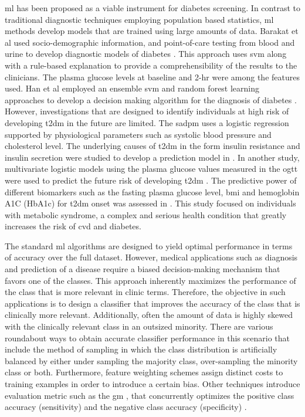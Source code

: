 \documentclass[journal,comsoc]{IEEEtran}
\renewcommand{\^}{\hat}  %
\begin{document}
\ac{ml} has been proposed as a viable instrument for diabetes screening. In contrast to traditional diagnostic techniques employing population based statistics, \ac{ml} methods develop models that are trained using large amounts of data. Barakat et al used socio-demographic information, and point-of-care testing from blood and urine to develop diagnostic models of diabetes \cite{barakat_intelligible_2010}. This approach uses \ac{svm} along with a rule-based explanation to provide a comprehensibility of the results to the clinicians. The plasma glucose levels at baseline and 2-hr were among the features used. Han et al employed an ensemble \ac{svm} and random forest learning approaches to develop a decision making algorithm for the diagnosis of diabetes \cite{han_rule_2015}. However, investigations that are designed to identify individuals at high risk of developing \ac{t2dm} in the future are limited. The \ac{sadpm} \cite{stern2002identification} uses a logistic regression supported by physiological parameters such as systolic blood pressure and cholesterol level. The underlying causes of \ac{t2dm} in the form insulin resistance and insulin secretion were studied to develop a prediction model in \cite{abdul-ghani_what_2007}. In another study, multivariate logistic models using the plasma glucose values measured in the \ac{ogtt} were used to predict the future risk of developing \ac{t2dm} \cite{abdul-ghani_two-step_2011,abdul2009fasting}. The predictive power of different biomarkers such as the fasting plasma glucose level, \ac{bmi} and hemoglobin A1C (HbA1c) for \ac{t2dm} onset was assessed in \cite{Ozery-Flato2013}. This study focused on individuals with metabolic syndrome, a complex and serious health condition that greatly increases the risk of \ac{cvd} and diabetes.

The standard \ac{ml} algorithms are designed to yield optimal performance in terms of accuracy over the full dataset. However, medical applications such as diagnosis and prediction of a disease require a biased decision-making mechanism that favors one of the classes. This approach inherently maximizes the performance of the class that is more relevant in clinic terms. Therefore, the objective in such applications is to design a classifier that improves the accuracy of the class that is clinically more relevant. Additionally, often the amount of data is highly skewed with the clinically relevant class in an outsized minority. There are various roundabout ways to obtain accurate classifier performance in this scenario that include the method of sampling \cite{chawla2002smote} in which the class distribution is artificially balanced by either under sampling the majority class, over-sampling the minority class or both. Furthermore, feature weighting schemes assign distinct costs to training examples \cite{Domingos} in order to introduce a certain bias. Other techniques introduce evaluation metric such as the \ac{gm} \cite{kubat1997addressing}, that concurrently optimizes the positive class accuracy (sensitivity) and the negative class accuracy (specificity) \cite{Tang_SVM}.
\end{document}
